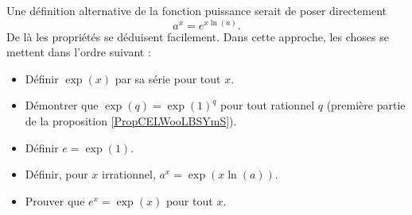 Une définition alternative de la fonction puissance serait de poser directement
\begin{equation*}
	a^x=e^{x\ln(a)}.
\end{equation*}
De là les propriétés se déduisent facilement. Dans cette approche, les choses se mettent dans l'ordre suivant :
\begin{itemize}
	\item Définir \( \exp(x)\) par sa série pour tout \( x\).
	\item Démontrer que \( \exp(q)=\exp(1)^q\) pour tout rationnel \( q\) (première partie de la proposition \ref{PropCELWooLBSYmS}).
	\item Définir \( e=\exp(1)\).
	\item Définir, pour \( x\) irrationnel, \( a^x=\exp(x\ln(a))\).
	\item Prouver que \( e^x=\exp(x)\) pour tout \( x\).
\end{itemize}
